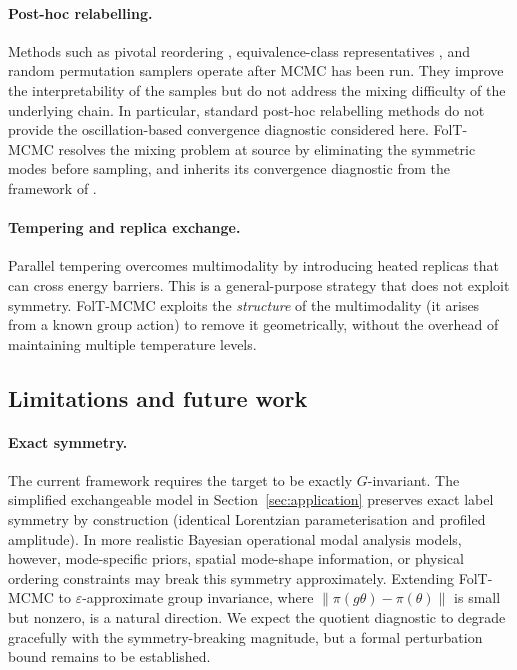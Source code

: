 \paragraph{Post-hoc relabelling.}
Methods such as pivotal reordering \citep{Stephens2000},
equivalence-class representatives \citep{Papastamoulis2010}, and
random permutation samplers \citep{FruhwirthSchnatter2001}
operate after MCMC has been run.  They improve the
interpretability of the samples but do not address the mixing
difficulty of the underlying chain.  In particular, standard post-hoc relabelling methods do not
provide the oscillation-based convergence diagnostic considered here.  FolT-MCMC
resolves the mixing problem at source by eliminating the
symmetric modes before sampling, and inherits its convergence
diagnostic from the framework of \citet{LCNF}.

\paragraph{Tempering and replica exchange.}
Parallel tempering \citep{Geyer1991,Earl2005} overcomes
multimodality by introducing heated replicas that can cross
energy barriers.  This is a general-purpose strategy that does
not exploit symmetry.  FolT-MCMC exploits the \emph{structure} of
the multimodality (it arises from a known group action) to remove
it geometrically, without the overhead of maintaining multiple
temperature levels.


\subsection{Limitations and future work}
\label{sec:disc_limitations}

\paragraph{Exact symmetry.}
The current framework requires the target to be exactly
$G$-invariant.  The simplified exchangeable model in
Section~\ref{sec:application} preserves exact label symmetry by
construction (identical Lorentzian parameterisation and profiled
amplitude).  In more realistic Bayesian operational modal analysis
models, however, mode-specific priors, spatial mode-shape
information, or physical ordering constraints may break this
symmetry approximately.  Extending FolT-MCMC to
$\varepsilon$-approximate group invariance, where
$\|\pi(g\theta) - \pi(\theta)\|$ is small but nonzero, is a
natural direction.  We expect the quotient diagnostic to degrade
gracefully with the symmetry-breaking magnitude, but a formal
perturbation bound remains to be established.

